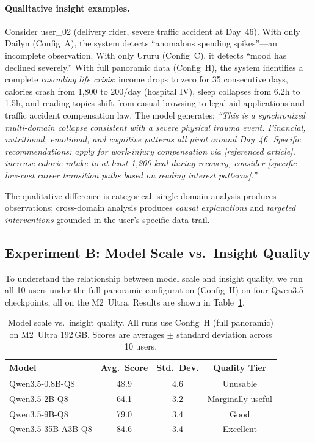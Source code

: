 \documentclass[11pt,a4paper]{article}
\newcommand{\appname}[1]{\textsf{#1}}
\begin{document}
\paragraph{Qualitative insight examples.}
Consider user\_02 (delivery rider, severe traffic accident at Day~46).
With only \appname{Dailyn} (Config~A), the system detects ``anomalous
spending spikes''---an incomplete observation. With only \appname{Ururu}
(Config~C), it detects ``mood has declined severely.'' With full panoramic
data (Config~H), the system identifies a complete \emph{cascading life crisis}:
income drops to zero for 35 consecutive days, calories crash from 1,800 to
200/day (hospital IV), sleep collapses from 6.2h to 1.5h, and reading topics
shift from casual browsing to legal aid applications and traffic accident
compensation law. The model generates: \emph{``This is a synchronized
multi-domain collapse consistent with a severe physical trauma event.
Financial, nutritional, emotional, and cognitive patterns all pivot around
Day~46. Specific recommendations: apply for work-injury compensation via
[referenced article], increase caloric intake to at least 1,200 kcal
during recovery, consider [specific low-cost career transition paths based
on reading interest patterns].''}

The qualitative difference is categorical: single-domain analysis produces
observations; cross-domain analysis produces \emph{causal explanations} and
\emph{targeted interventions} grounded in the user's specific data trail.


\subsection{Experiment B: Model Scale vs.\ Insight Quality}
\label{sec:results:scale}

To understand the relationship between model scale and insight quality, we run
all 10 users under the full panoramic configuration (Config~H) on four
Qwen3.5 checkpoints, all on the M2~Ultra. Results are shown in
Table~\ref{tab:scale}.

\begin{table}[H]
\centering
\caption{Model scale vs.\ insight quality. All runs use Config~H (full
panoramic) on M2~Ultra 192\,GB. Scores are averages $\pm$ standard deviation
across 10 users.}
\label{tab:scale}
\begin{tabular}{@{}lccc@{}}
\toprule
\textbf{Model} & \textbf{Avg.\ Score} & \textbf{Std.\ Dev.} & \textbf{Quality Tier} \\
\midrule
Qwen3.5-0.8B-Q8     & 48.9 & 4.6 & Unusable \\
Qwen3.5-2B-Q8       & 64.1 & 3.2 & Marginally useful \\
Qwen3.5-9B-Q8       & 79.0 & 3.4 & Good \\
Qwen3.5-35B-A3B-Q8  & 84.6 & 3.4 & Excellent \\
\bottomrule
\end{tabular}
\end{table}
\end{document}
